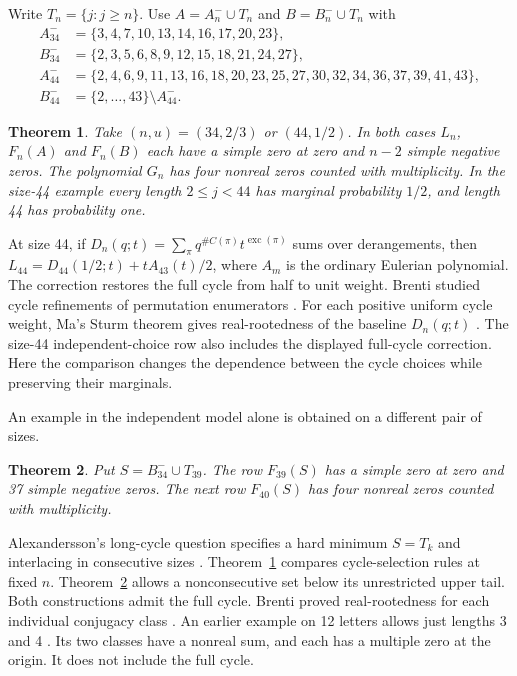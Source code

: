 \documentclass[10pt,a4paper]{article}
\newtheorem{theorem}{Theorem}[section]
\newcommand{\exc}{\operatorname{exc}}
\begin{document}
Write $T_n=\{j:j\ge n\}$. Use $A=A_n^-\cup T_n$ and $B=B_n^-\cup T_n$ with
\begin{align*}
 A_{34}^-&=\{3,4,7,10,13,14,16,17,20,23\},\\
 B_{34}^-&=\{2,3,5,6,8,9,12,15,18,21,24,27\},\\
 A_{44}^-&=\{2,4,6,9,11,13,16,18,20,23,25,27,30,32,34,36,37,39,41,43\},\\
 B_{44}^-&=\{2,\ldots,43\}\setminus A_{44}^-.
\end{align*}
\begin{theorem}\label{main}
Take $(n,u)=(34,2/3)$ or $(44,1/2)$. In both cases $L_n$, $F_n(A)$ and $F_n(B)$ each have a simple zero at zero and $n-2$ simple negative zeros. The polynomial $G_n$ has four nonreal zeros counted with multiplicity. In the size-44 example every length $2\le j<44$ has marginal probability $1/2$, and length 44 has probability one.
\end{theorem}
At size 44, if $D_n(q;t)=\sum_{\pi}q^{\#C(\pi)}t^{\exc(\pi)}$ sums over derangements, then $L_{44}=D_{44}(1/2;t)+t A_{43}(t)/2$, where $A_m$ is the ordinary Eulerian polynomial. The correction restores the full cycle from half to unit weight. Brenti studied cycle refinements of permutation enumerators \cite{brenti}. For each positive uniform cycle weight, Ma's Sturm theorem gives real-rootedness of the baseline $D_n(q;t)$ \cite[Theorem~3.5]{mad}. The size-44 independent-choice row also includes the displayed full-cycle correction. Here the comparison changes the dependence between the cycle choices while preserving their marginals.

An example in the independent model alone is obtained on a different pair of sizes.
\begin{theorem}\label{single}
Put $S=B_{34}^-\cup T_{39}$. The row $F_{39}(S)$ has a simple zero at zero and 37 simple negative zeros. The next row $F_{40}(S)$ has four nonreal zeros counted with multiplicity.
\end{theorem}
Alexandersson's long-cycle question specifies a hard minimum $S=T_k$ and interlacing in consecutive sizes \cite{alex}. Theorem~\ref{main} compares cycle-selection rules at fixed $n$. Theorem~\ref{single} allows a nonconsecutive set below its unrestricted upper tail. Both constructions admit the full cycle. Brenti proved real-rootedness for each individual conjugacy class \cite[Thms.~3.1--3.2]{brenti}. An earlier example on 12 letters allows just lengths 3 and 4 \cite{earlier}. Its two classes have a nonreal sum, and each has a multiple zero at the origin. It does not include the full cycle.
\end{document}
